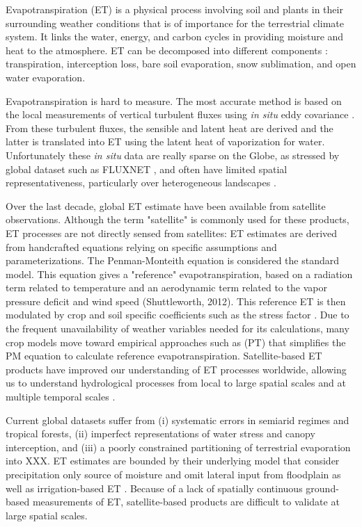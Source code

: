 \documentclass[draft]{agujournal2019}
\begin{document}
Evapotranspiration (ET) is a physical process involving soil and plants in their surrounding weather conditions that is of importance for the terrestrial climate system. 
It links the water, energy, and carbon cycles \cite{Fisher2017} in providing moisture and heat to the atmosphere. 
ET can be decomposed into different components : transpiration, interception loss, bare soil evaporation, snow sublimation, and open water evaporation.

Evapotranspiration is hard to measure. 
The most accurate method is based on the local measurements of vertical turbulent fluxes using {\it in situ} eddy covariance \cite{falge2016}. 
From these turbulent fluxes, the sensible and latent heat are derived and the latter is translated into ET using the latent heat of vaporization for water. 
Unfortunately these {\it in situ} data are really sparse on the Globe, as stressed by global dataset such as FLUXNET \cite{falge2016}, 
and often have limited spatial representativeness, particularly over heterogeneous landscapes \cite{Miralles2011}.

Over the last decade, global ET estimate have been available from satellite observations. 
Although the term "satellite" is commonly used for these products, ET processes are not directly sensed from satellites: 
ET estimates are derived from handcrafted equations relying on specific assumptions and parameterizations. 
The Penman-Monteith equation \cite{Penman1948a, Monteith1965a} is considered the standard model. 
This equation gives a "reference" evapotranspiration, 
based on a radiation term related to temperature and an aerodynamic term related to the vapor pressure deficit and wind speed (Shuttleworth, 2012). 
This reference ET is then modulated by crop and soil specific coefficients such as the stress factor \cite{Penman1948a, Monteith1965a}. 
Due to the frequent unavailability of weather variables needed for its calculations, 
many crop models move toward empirical approaches such as \cite{PRIESTLEY1972} (PT) 
that simplifies the PM equation to calculate reference evapotranspiration. 
Satellite-based ET products have improved our understanding of ET processes worldwide, 
allowing us to understand hydrological processes from local to large spatial scales and at multiple temporal scales \cite{Fassoni-Andrade2021}. 

Current global datasets suffer from 
(i) systematic errors in semiarid regimes and tropical forests, 
(ii) imperfect representations of water stress and canopy interception, and 
(iii) a poorly constrained partitioning of terrestrial evaporation into  \cite{Dorigo2021} XXX. 
ET estimates are bounded by their underlying model that consider precipitation only source of moisture and omit lateral input from floodplain as well as irrigation-based ET \cite{VanDijk2018}. Because of a lack of spatially continuous ground-based measurements of ET, satellite-based products are difficult to validate at large spatial scales.
\end{document}
